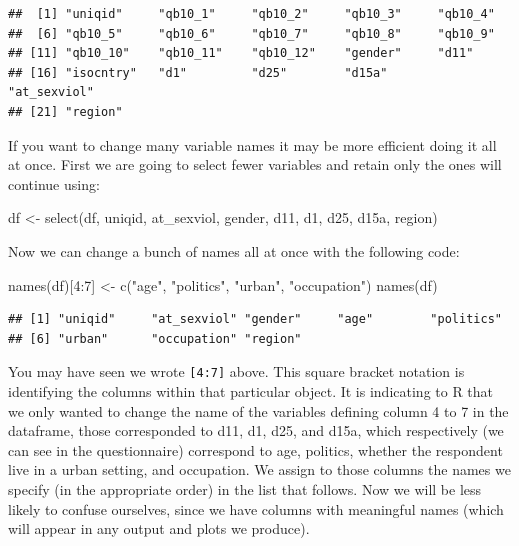 \documentclass[
]{book}
\newenvironment{Shaded}{\begin{snugshade}}{\end{snugshade}}
\newcommand{\DecValTok}[1]{\textcolor[rgb]{0.00,0.00,0.81}{#1}}
\newcommand{\FunctionTok}[1]{\textcolor[rgb]{0.00,0.00,0.00}{#1}}
\newcommand{\NormalTok}[1]{#1}
\newcommand{\OtherTok}[1]{\textcolor[rgb]{0.56,0.35,0.01}{#1}}
\newcommand{\SpecialCharTok}[1]{\textcolor[rgb]{0.00,0.00,0.00}{#1}}
\newcommand{\StringTok}[1]{\textcolor[rgb]{0.31,0.60,0.02}{#1}}
\begin{document}
\begin{verbatim}
##  [1] "uniqid"     "qb10_1"     "qb10_2"     "qb10_3"     "qb10_4"    
##  [6] "qb10_5"     "qb10_6"     "qb10_7"     "qb10_8"     "qb10_9"    
## [11] "qb10_10"    "qb10_11"    "qb10_12"    "gender"     "d11"       
## [16] "isocntry"   "d1"         "d25"        "d15a"       "at_sexviol"
## [21] "region"
\end{verbatim}

If you want to change many variable names it may be more efficient doing it all at once. First we are going to select fewer variables and retain only the ones will continue using:

\begin{Shaded}
\begin{Highlighting}[]
\NormalTok{df }\OtherTok{\textless{}{-}} \FunctionTok{select}\NormalTok{(df, uniqid, at\_sexviol, gender, d11, d1, d25, d15a, region)}
\end{Highlighting}
\end{Shaded}

Now we can change a bunch of names all at once with the following code:

\begin{Shaded}
\begin{Highlighting}[]
\FunctionTok{names}\NormalTok{(df)[}\DecValTok{4}\SpecialCharTok{:}\DecValTok{7}\NormalTok{] }\OtherTok{\textless{}{-}} \FunctionTok{c}\NormalTok{(}\StringTok{"age"}\NormalTok{, }\StringTok{"politics"}\NormalTok{, }\StringTok{"urban"}\NormalTok{, }\StringTok{"occupation"}\NormalTok{)}
\FunctionTok{names}\NormalTok{(df)}
\end{Highlighting}
\end{Shaded}

\begin{verbatim}
## [1] "uniqid"     "at_sexviol" "gender"     "age"        "politics"  
## [6] "urban"      "occupation" "region"
\end{verbatim}

You may have seen we wrote \texttt{{[}4:7{]}} above. This square bracket notation is identifying the columns within that particular object. It is indicating to R that we only wanted to change the name of the variables defining column 4 to 7 in the dataframe, those corresponded to d11, d1, d25, and d15a, which respectively (we can see in the questionnaire) correspond to age, politics, whether the respondent live in a urban setting, and occupation. We assign to those columns the names we specify (in the appropriate order) in the list that follows. Now we will be less likely to confuse ourselves, since we have columns with meaningful names (which will appear in any output and plots we produce).
\end{document}
